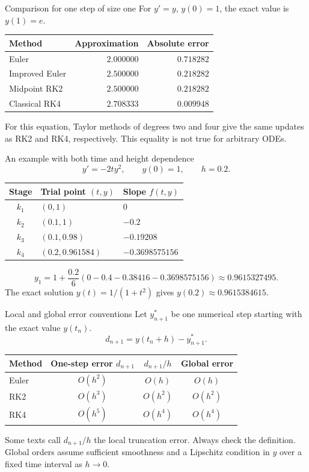\documentclass[aspectratio=169]{beamer}
\begin{document}
\begin{frame}{Comparison for one step of size one}
For $y'=y$, $y(0)=1$, the exact value is $y(1)=e$.
\medskip
\renewcommand{\arraystretch}{1.5}
\begin{center}
\begin{tabular}{lrr}
\toprule Method & Approximation & Absolute error\\\midrule
Euler & $2.000000$ & $0.718282$\\
Improved Euler & $2.500000$ & $0.218282$\\
Midpoint RK2 & $2.500000$ & $0.218282$\\
Classical RK4 & $2.708333$ & $0.009948$\\\bottomrule
\end{tabular}
\end{center}
For this equation, Taylor methods of degrees two and four give the same updates as RK2 and RK4, respectively. This equality is not true for arbitrary ODEs.
\end{frame}
\begin{frame}{An example with both time and height dependence}
\[y'=-2ty^2,\qquad y(0)=1,\qquad h=0.2.\]
\renewcommand{\arraystretch}{1.35}
\begin{center}
\begin{tabular}{cll}
\toprule Stage & Trial point $(t,y)$ & Slope $f(t,y)$\\\midrule
$k_1$ & $(0,1)$ & $0$\\
$k_2$ & $(0.1,1)$ & $-0.2$\\
$k_3$ & $(0.1,0.98)$ & $-0.19208$\\
$k_4$ & $(0.2,0.961584)$ & $-0.3698575156$\\\bottomrule
\end{tabular}
\end{center}
\[y_1=1+\frac{0.2}{6}(0-0.4-0.38416-0.3698575156)
\approx\boxed{0.9615327495}.\]
The exact solution $y(t)=1/(1+t^2)$ gives $y(0.2)\approx0.9615384615$.
\end{frame}
\begin{frame}{Local and global error conventions}
Let $y_{n+1}^{*}$ be one numerical step starting with the exact value $y(t_n)$.
\[d_{n+1}=y(t_n+h)-y_{n+1}^{*}.\]
\renewcommand{\arraystretch}{1.4}
\begin{center}
\begin{tabular}{lccc}
\toprule Method & One-step error $d_{n+1}$ & $d_{n+1}/h$ & Global error\\\midrule
Euler & $O(h^2)$ & $O(h)$ & $O(h)$\\
RK2 & $O(h^3)$ & $O(h^2)$ & $O(h^2)$\\
RK4 & $O(h^5)$ & $O(h^4)$ & $O(h^4)$\\\bottomrule
\end{tabular}
\end{center}
Some texts call $d_{n+1}/h$ the local truncation error. Always check the definition.
\medskip
Global orders assume sufficient smoothness and a Lipschitz condition in $y$ over a fixed time interval as $h\to0$.
\end{frame}
\end{document}
